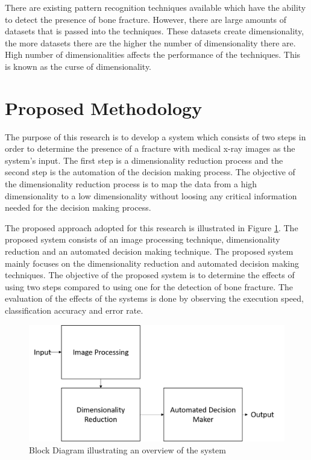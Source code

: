 \documentclass[11pt,twocolumn]{witseiepaper}
\begin{document}
	There are existing pattern recognition techniques available which have the ability to detect the presence of bone fracture. However, there are large amounts of datasets that is passed into the techniques. These datasets create dimensionality, the more datasets there are the higher the number of dimensionality there are. High number of dimensionalities affects the performance of the techniques. This is known as the curse of dimensionality. 
	
	\section{Proposed Methodology}
	The purpose of this research is to develop a system which consists of two steps in order to determine the presence of a fracture with medical x-ray images as the system's input. The first step is a dimensionality reduction process and the second step is the automation of the decision making process. The objective of the dimensionality reduction process is to map the data from a high dimensionality to a low dimensionality without loosing any critical information needed for the decision making process. 
	
	The proposed approach adopted for this research is illustrated in Figure \ref{fig:system overview}. The proposed system consists of an image processing technique, dimensionality reduction and an automated decision making technique. The proposed system mainly focuses on the dimensionality reduction and automated decision making techniques. The objective of the proposed system is to determine the effects of using two steps compared to using one for the detection of bone fracture. The evaluation of the effects of the systems is done by observing the execution speed, classification accuracy and error rate.
	
	\begin{figure}[!h]
		\centering
		\includegraphics[scale=0.23]{system_overview.png}
		\caption{Block Diagram illustrating an overview of the system }
		\label{fig:system overview}
	\end{figure}
	
\end{document}
